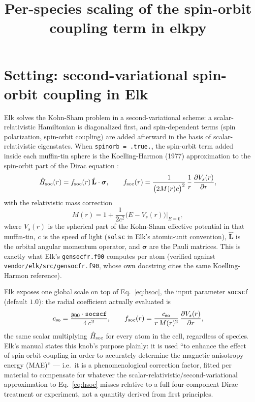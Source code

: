 \documentclass[11pt]{article}
\title{Per-species scaling of the spin-orbit coupling term in elkpy}
\author{}
\date{}
\begin{document}
\maketitle

\section{Setting: second-variational spin-orbit coupling in Elk}

Elk solves the Kohn-Sham problem in a second-variational scheme: a scalar-relativistic
Hamiltonian is diagonalized first, and spin-dependent terms (spin polarization,
spin-orbit coupling) are added afterward in the basis of scalar-relativistic
eigenstates. When \texttt{spinorb = .true.}, the spin-orbit term added inside each
muffin-tin sphere is the Koelling-Harmon (1977) approximation to the spin-orbit part of
the Dirac equation \cite{koelling1977}:
\begin{equation}
  \hat H_{\rm soc}(r) = f_{\rm soc}(r)\,\hat{\mathbf L}\cdot\boldsymbol\sigma,
  \qquad
  f_{\rm soc}(r) = \frac{1}{\bigl(2 M(r) c\bigr)^2}\,\frac{1}{r}\,
    \frac{\partial V_s(r)}{\partial r},
  \label{eq:hsoc}
\end{equation}
with the relativistic mass correction
\begin{equation}
  M(r) = 1 + \frac{1}{2c^2}\bigl(E - V_s(r)\bigr)\Big|_{E=0},
\end{equation}
where $V_s(r)$ is the spherical part of the Kohn-Sham effective potential in that
muffin-tin, $c$ is the speed of light (\texttt{solsc} in Elk's atomic-unit convention),
$\hat{\mathbf L}$ is the orbital angular momentum operator, and $\boldsymbol\sigma$ are
the Pauli matrices. This is exactly what Elk's \texttt{gensocfr.f90} computes per atom
(verified against \texttt{vendor/elk/src/gensocfr.f90}, whose own docstring cites the
same Koelling-Harmon reference).

Elk exposes one global scale on top of Eq.~\eqref{eq:hsoc}, the input parameter
\texttt{socscf} (default $1.0$): the radial coefficient actually evaluated is
\begin{equation}
  c_{\rm so} = \frac{y_{00}\cdot \texttt{socscf}}{4\,c^2},
  \qquad
  f_{\rm soc}(r) = \frac{c_{\rm so}}{r\,M(r)^2}\,\frac{\partial V_s(r)}{\partial r},
  \label{eq:socscf}
\end{equation}
the same scalar multiplying $\hat H_{\rm soc}$ for every atom in the cell, regardless
of species. Elk's manual states this knob's purpose plainly: it is used ``to enhance
the effect of spin-orbit coupling in order to accurately determine the magnetic
anisotropy energy (MAE)'' — i.e.\ it is a phenomenological correction factor, fitted
per material to compensate for whatever the scalar-relativistic/second-variational
approximation to Eq.~\eqref{eq:hsoc} misses relative to a full four-component Dirac
treatment or experiment, not a quantity derived from first principles.
\end{document}
